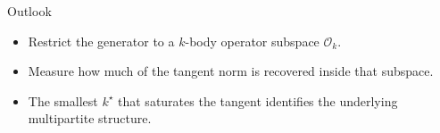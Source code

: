 \documentclass[final]{beamer}
\newlength{\sepwidth}
\newlength{\colwidth}
\newcommand{\separatorcolumn}{\begin{column}{\sepwidth}\end{column}}
\begin{document}
\begin{frame}[t]
\begin{columns}[t]
\begin{column}{\colwidth}
\begin{block}{Outlook}
    \begin{itemize}
      \item Restrict the generator to a $k$-body operator subspace $\mathcal{O}_k$.
      \item Measure how much of the tangent norm is recovered inside that subspace.
      \item The smallest $k^\star$ that saturates the tangent identifies the underlying multipartite structure.
    \end{itemize}

  \end{block}


\end{column}

\separatorcolumn
\end{columns}
\end{frame}
\end{document}
